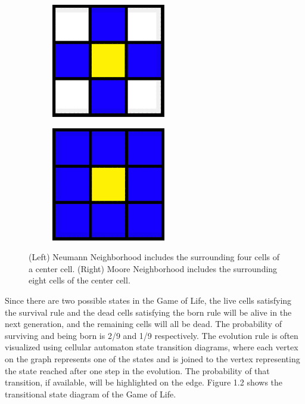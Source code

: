 \documentclass[12pt]{article}
\numberwithin{figure}{section} %
\begin{document}
\begin{figure}[H]
   \begin{subfigure}{0.48\textwidth}
     \centering
     \includegraphics[width=.6\linewidth]{Section1/1}
   \end{subfigure}\hfill
   \begin{subfigure}{0.48\textwidth}
     \centering
     \includegraphics[width=.6\linewidth]{Section1/2}
   \end{subfigure}
   \caption{(Left) Neumann Neighborhood includes the surrounding four cells of a center cell. (Right) Moore Neighborhood includes the surrounding eight cells of the center cell.}
   \vspace{-1.5em}
   \label{Fig:Neighborhood}
\end{figure}

Since there are two possible states in the Game of Life, the live cells satisfying the survival rule and the dead cells satisfying the born rule will be alive in the next generation, and the remaining cells will all be dead. The probability of surviving and being born is 2/9 and 1/9 respectively. The evolution rule is often visualized using cellular automaton state transition diagrams, where each vertex on the graph represents one of the states and is joined to the vertex representing the state reached after one step in the evolution. The probability of that transition, if available, will be highlighted on the edge. Figure 1.2 shows the transitional state diagram of the Game of Life. 
\end{document}
